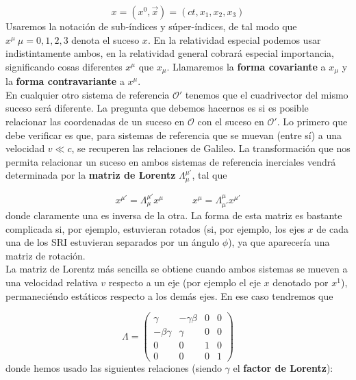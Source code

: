 \documentclass[12pt,a4paper]{book}
\numberwithin{equation}{section}
\numberwithin{figure}{section}
\newcommand{\tquad}{\quad \quad \quad}
\begin{document}
\begin{equation}
x = (x^0, \vec{x}) = (ct,x_1,x_2,x_3)
\end{equation}
Usaremos la notación de sub-índices y súper-índices, de tal modo que $x^\mu \ \mu=0,1,2,3$ denota el suceso $x$. En la relatividad especial podemos usar indistintamente ambos, en la relatividad general cobrará especial importancia, significando cosas diferentes $x^\mu$ que $x_\mu$. Llamaremos la \textbf{forma covariante} a $x_{\mu}$ y la \textbf{forma contravariante} a $x^{\mu}$. \\

En cualquier otro sistema de referencia $\mathcal{O}'$ tenemos que el cuadrivector del mismo suceso será diferente. La pregunta que debemos hacernos es si es posible relacionar las coordenadas de un suceso en $\mathcal{O}$ con el suceso en $\mathcal{O}'$. Lo primero que debe verificar es que, para sistemas de referencia que se muevan (entre sí) a una velocidad $v\ll c$, se recuperen las relaciones de Galileo. La transformación que nos permita relacionar un suceso en ambos sistemas de referencia inerciales vendrá determinada por la \textbf{matriz de Lorentz} $\Lambda_\mu^{\mu'}$, tal que 

\begin{equation}
x^{\mu'} = \Lambda_\mu^{\mu'} x^{\mu}  \tquad 
x^{\mu} = \Lambda_{\mu'}^{\mu} x^{\mu'} 
\end{equation}
donde claramente una es inversa de la otra. La forma de esta matriz es bastante complicada si, por ejemplo, estuvieran rotados (si, por ejemplo, los ejes $x$ de cada una de los SRI estuvieran separados por un ángulo $\phi$), ya que aparecería una matriz de rotación. \\

La matriz de Lorentz más sencilla se obtiene cuando ambos sistemas se mueven a una velocidad relativa $v$ respecto a un eje (por ejemplo el eje $x$ denotado por $x^1$), permaneciéndo estáticos respecto a los demás ejes. En ese caso tendremos que

\begin{equation}
\Lambda = \begin{pmatrix}
\gamma & - \gamma \beta & 0 & 0 \\
 - \beta \gamma &  \gamma  & 0 & 0 \\
0 & 0  & 1 & 0 \\
0 & 0  & 0 & 1
\end{pmatrix}
\end{equation}
donde hemos usado las siguientes relaciones (siendo $\gamma$ el \textbf{factor de Lorentz}):
\end{document}
